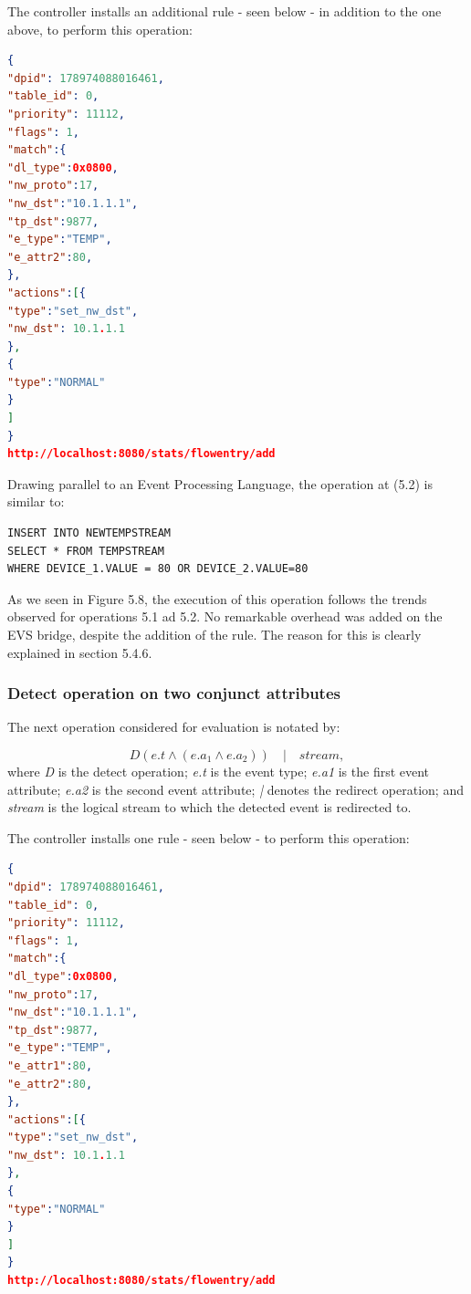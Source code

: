 The controller installs an additional rule - seen below - in addition to the one above, to perform this operation:
\begin{lstlisting}[language=json,firstnumber=1]
{
"dpid": 178974088016461,
"table_id": 0,
"priority": 11112,
"flags": 1,
"match":{
"dl_type":0x0800,
"nw_proto":17,
"nw_dst":"10.1.1.1",
"tp_dst":9877,
"e_type":"TEMP",
"e_attr2":80,
},
"actions":[{
"type":"set_nw_dst",
"nw_dst": 10.1.1.1
},
{
"type":"NORMAL"
}
]
}
http://localhost:8080/stats/flowentry/add \end{lstlisting}

Drawing parallel to an Event Processing Language, the operation at (5.2) is similar to:

\begin{verbatim}
INSERT INTO NEWTEMPSTREAM
SELECT * FROM TEMPSTREAM
WHERE DEVICE_1.VALUE = 80 OR DEVICE_2.VALUE=80
\end{verbatim}

As we seen in Figure 5.8, the execution of this operation follows the trends observed for operations 5.1 ad 5.2. No remarkable overhead was added on the EVS bridge, despite the addition of the rule. The reason for this is clearly explained in section 5.4.6.


\subsubsection{Detect operation on two conjunct attributes}
The next operation considered for evaluation is notated by:

\begin{equation}D(e.t  \wedge (e.a_1 \wedge e.a_2)) \quad | \quad stream, \end{equation}
where \textit{D} is the detect operation; \newline
\textit{e.t} is the event type; \newline
\textit{e.a1} is the first event attribute; \newline
\textit{e.a2} is the second event attribute;
\textit{|} denotes the redirect operation; \newline
and \textit{stream} is the logical stream to which the detected event is redirected to. \newline \newline

The controller installs one rule - seen below - to perform this operation:
\begin{lstlisting}[language=json,firstnumber=1]
{
"dpid": 178974088016461,
"table_id": 0,
"priority": 11112,
"flags": 1,
"match":{
"dl_type":0x0800,
"nw_proto":17,
"nw_dst":"10.1.1.1",
"tp_dst":9877,
"e_type":"TEMP",
"e_attr1":80,
"e_attr2":80,
},
"actions":[{
"type":"set_nw_dst",
"nw_dst": 10.1.1.1
},
{
"type":"NORMAL"
}
]
}
http://localhost:8080/stats/flowentry/add \end{lstlisting}

